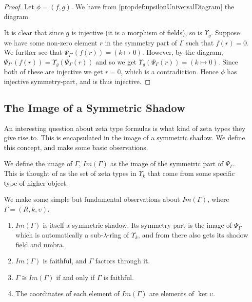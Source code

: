 \begin{proof}
  Let $\phi = (f, g)$. We have from \ref{propdef:upsilonUniversalDiagram} the diagram
  \begin{center}
  \end{center}
  It is clear that since $g$ is injective (it is a morphism of fields), so is $\Upsilon_{g}$. Suppose we have some non-zero element $r$ in the symmetry part of $\Gamma$ such that $f(r) = 0$. We further see that $\Psi_{\Gamma'}(f(r)) = (k \mapsto 0)$. However, by the diagram, $\Psi_{\Gamma'}(f(r)) = \Upsilon_g(\Psi_{\Gamma}(r))$ and so we get $\Upsilon_g(\Psi_{\Gamma}(r)) = (k \mapsto 0)$. Since both of these are injective we get $r = 0$, which is a contradiction. Hence $\phi$ has injective symmetry-part, and is thus injective. \qedhere
\end{proof}

\subsection{The Image of a Symmetric Shadow}
An interesting question about zeta type formulas is what kind of zeta types they give rise to. This is encapsulated in the image of a symmetric shadow. We define this concept, and make some basic observations.

\begin{definition}
  We define the image of $\Gamma$, $Im(\Gamma)$ as the image of the symmetric part of $\Psi_\Gamma$. This is thought of as the set of zeta types in $\Upsilon_k$ that come from some specific type of higher object.  
\end{definition}

\begin{proposition}
  We make some simple but fundamental observations about $Im(\Gamma)$, where $\Gamma = (R, k, \upsilon)$.
  \begin{enumerate}
    \item $Im(\Gamma)$ is itself a symmetric shadow. Its symmetry part is the image of $\Psi_\Gamma$ which is automatically a sub-$\lambda$-ring of $\Upsilon_k$, and from there also gets its shadow field and umbra.
    \item $Im(\Gamma)$ is faithful, and $\Gamma$ factors through it.
    \item $\Gamma \cong Im(\Gamma)$ if and only if $\Gamma$ is faithful.
    \item The coordinates of each element of $Im(\Gamma)$ are elements of $\ker \upsilon$.
  \end{enumerate}
\end{proposition}

